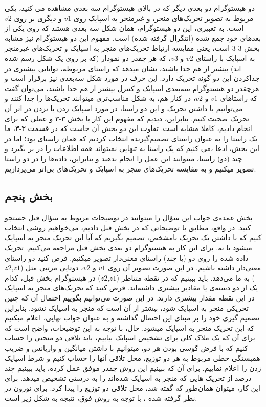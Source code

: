 \documentclass[12pt,onecolumn,a4paper,fleqn]{article}
\begin{document}
دو هیستوگرام دو بعدی دیگر که در بالای هیستوگرام سه بعدی مشاهده می کنید، یکی مربوط به تصویر تحریک‌های منجر، و غیرمنجر به اسپایک روی $ v1 $ و دیگری بر روی $ v2 $‌ است. به تعبیری، این دو هیستوگرام، همان شکل سه بعدی هستند که روی یکی از بعدهای خود جمع شده (انتگرال گرفته شده) است. مفهوم این دو هیستوگرام نیز مشابه بخش 3-3 است، یعنی مقایسه ارتباط تحریک‌های منجر به اسپایک و تحریک‌های غیرمنجر به اسپایک با راستای $ v2 $ و $ v3 $، که هر چقدر دو نمودار (که بر روی یک شکل رسم شده اند) بیشتر از هم جدا باشند، نشان میدهد که راستای مربوطه، توانایی بیشتری در جداکردن این دو گونه تحریک دارد. این حرف در مورد شکل سه‌بعدی نیز برقرار است و هرچقدر دو هیستوگرام سه‌بعدی اسپایک و کنترل بیشتر از هم جدا باشند، می‌توان گفت که راستاهای $ v1 $ و $ v2 $، در کنار هم، به شکل مناسب‌تری میتوانند تحریک‌ها را جدا کنند و می‌توانیم با داشتن تحریک و این دو راستا، در مورد اسپایک زدن یا نزدن در اثر آن تحریک صحبت کنیم.
بنابراین، دیدیم که مفهوم این کار با بخش ۳-۳ و عملی که برای  انجام دادیم، کاملا مشابه است. تفاوت این دو بخش آن جاست که در قسمت ۳-۳، ما یک راستا را به عنوان راستای تصمیم‌گیرنده انتخاب کردیم که همان راستای  بود؛ اما در این بخش، ادعا ،می کنیم که یک راستا به تنهایی نمیتواند همه اطلاعات را در بر بگیرد و چند (دو) راستا، میتوانند این عمل را انجام بدهند و بنابراین، داده‌ها را در دو راستا تصویر میکنیم و به مقایسه تحریک‌های منجر به اسپایک و تحریک‌های بی‌ا‌ثر می‌پردازیم. 

\subsection{بخش پنجم}

بخش عمده‌ی جواب این سؤال را میتوانید در توضیحات مربوط به سؤال قبل جستجو کنید. در واقع، مطابق با توضیحاتی که در بخش قبل دادیم، می‌خواهیم روشی انتخاب کنیم که با داشتن یک تحریک نامشخص، تصمیم بگیریم که آیا این تحریک منجر به اسپایک میشود یا نه. برای این کار به هیستوگرام دو بعدی بخش قبل مراجعه می‌کنیم. تحریک داده شده را روی دو (یا چند) راستای معنی‌دار تصویر میکنیم. فرض کنید دو راستای معنی‌دار داشته باشیم. در این صورت تصویر آن روی $ v1 $ و $ v2 $، دوتایی مرتبی مثل ($ z1 $,$ z2 $) به ما می‌دهد. باید ببینیم که در نقطه متناظر ($ z1 $,$ z2 $) در هیستوگرام بخش قبل، کدام یک از دو دسته‌ی  یا  مقادیر بیشتری داشته‌اند. فرض کنید که تحریک‌های منجر به اسپایک در این نقطه مقدار بیشتری دارند. در این صورت می‌توانیم بگوییم احتمال آن که چنین تحریکی منجر به اسپایک شود، بیشتر از آن است که منجر به اسپایک نشود. بنابراین تصمیم گیری خود را بر مبنای این احتمال گذاشته و به عنوان جواب نهایی، اعلام میکنیم که این تحریک منجر به اسپایک میشود. حال، با توجه به این توضیحات، واضح است که برای آن که یک ملاک کلی برای تشخیص اسپایک بیابیم، باید تلاقی دو منحنی را حساب کنیم که با فرض گوسی بودن هر دو، میتوانیم با داشتن میانگین و واریانس و ضریب همبستگی خطی مربوط به هر دو توزیع، محل تلاقی آنها را حساب کنیم و شرط اسپایک زدن را اعلام نماییم.
برای آن که ببینیم این روش چقدر موفق عمل کرده، باید ببینیم چند درصد از تحریک هایی که منجر به اسپایک شده‌اند را به درستی تشخیص میدهد. برای این کار، میتوان همان‌‌طور که گفته شد، محل تلاقی دو توزیع را پیدا کرد.
برای نورون در نظر گرفته شده ، با توجه به روش فوق، نتیجه به شکل زیر است.
\end{document}
